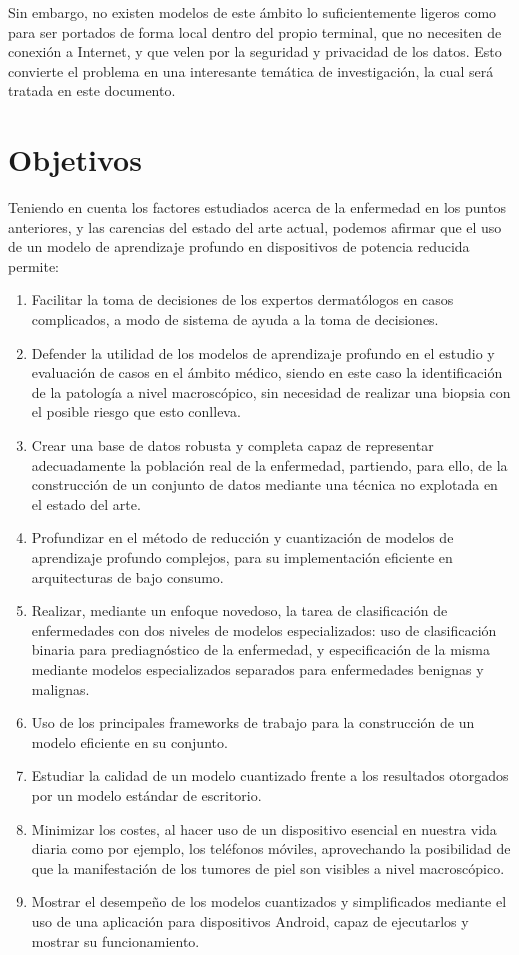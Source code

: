 Sin embargo, no existen modelos de este ámbito lo suficientemente ligeros como para ser portados de forma local dentro del propio terminal, que no necesiten de conexión a Internet, y que velen por la seguridad y privacidad de los datos. Esto convierte el problema en una interesante temática de investigación, la cual será tratada en este documento.

\section{Objetivos}

Teniendo en cuenta los factores estudiados acerca de la enfermedad en los puntos anteriores, y las carencias del estado del arte actual, podemos afirmar que el uso de un modelo de aprendizaje profundo en dispositivos de potencia reducida permite:
\begin{enumerate}
	\item Facilitar la toma de decisiones de los expertos dermatólogos en casos complicados, a modo de sistema de ayuda a la toma de decisiones.
	\item Defender la utilidad de los modelos de aprendizaje profundo en el estudio y evaluación de casos en el ámbito médico, siendo en este caso la identificación de la patología a nivel macroscópico, sin necesidad de realizar una biopsia con el posible riesgo que esto conlleva.
	\item Crear una base de datos robusta y completa capaz de representar adecuadamente la población real de la enfermedad, partiendo, para ello, de la construcción de un conjunto de datos mediante una técnica no explotada en el estado del arte.
	\item Profundizar en el método de reducción y cuantización de modelos de aprendizaje profundo complejos, para su implementación eficiente en arquitecturas de bajo consumo.
	\item Realizar, mediante un enfoque novedoso, la tarea de clasificación de enfermedades con dos niveles de modelos especializados: uso de clasificación binaria para prediagnóstico de la enfermedad, y especificación de la misma mediante modelos especializados separados para enfermedades benignas y malignas.
	\item Uso de los principales frameworks de trabajo para la construcción de un modelo eficiente en su conjunto.
	\item Estudiar la calidad de un modelo cuantizado frente a los resultados otorgados por un modelo estándar de escritorio.
	\item Minimizar los costes, al hacer uso de un dispositivo esencial en nuestra vida diaria como por ejemplo, los teléfonos móviles, aprovechando la posibilidad de que la manifestación de los tumores de piel son visibles a nivel macroscópico.
	\item Mostrar el desempeño de los modelos cuantizados y simplificados mediante el uso de una aplicación para dispositivos Android, capaz de ejecutarlos y mostrar su funcionamiento.
\end{enumerate}

